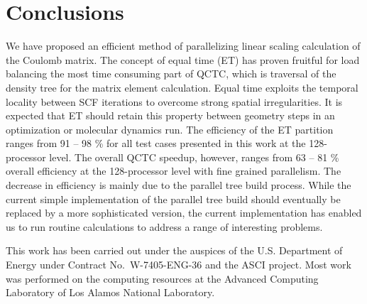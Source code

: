 \commentoutA{\documentclass[prl,aps,twocolumn,twocolumngrid,superbib]{revtex4}}
\begin{document}
\section{Conclusions}
\label{conclusions}
We have proposed an efficient method of parallelizing linear scaling calculation of
the Coulomb matrix. The concept of equal time (ET) has proven fruitful
for load balancing the most time consuming part of QCTC, which is
traversal of the density tree for the matrix element calculation.
Equal time exploits the temporal locality between SCF iterations to
overcome strong spatial irregularities. It is expected that ET should
retain this property between geometry steps in an optimization or
molecular dynamics run.  The efficiency of the ET partition ranges
from 91 -- 98 \% for all test cases presented in this work at the
128-processor level. The overall QCTC speedup, however, ranges from 63
-- 81 \% overall efficiency at the 128-processor level with fine
grained parallelism.  The decrease in efficiency is mainly due to the
parallel tree build process.  While the current simple implementation
of the parallel tree build should eventually be replaced by a more
sophisticated version, the current implementation has enabled us to
run routine calculations to address a range of interesting
problems\cite{CGan04A,CGan04C}.

\begin{acknowledgments}
This work has been carried out under the auspices of the
U.S. Department of Energy under Contract No.~W-7405-ENG-36 and the
ASCI project.  Most work was performed on the computing resources at
the Advanced Computing Laboratory of Los Alamos National Laboratory.
\end{acknowledgments}

 
\end{document}
